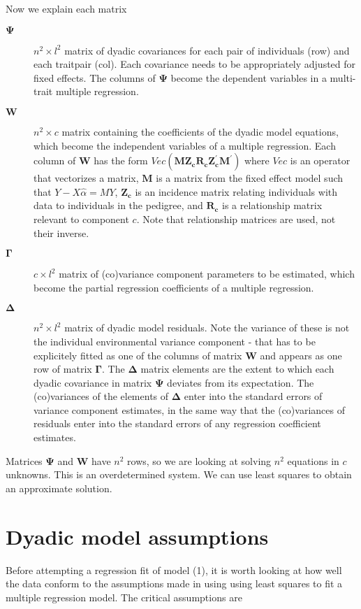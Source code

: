 \documentclass[titlepage,a4paper,12pt]{article}  %
\begin{document}
Now we explain each matrix 
\begin{description}
\item[$\bm{\Psi}$] $n^{2} \times l^{2}$ matrix of dyadic covariances for each pair of individuals (row) and each traitpair (col). Each covariance needs to be appropriately adjusted for fixed effects. The columns of $\bm{\Psi}$ become the dependent variables in a multi-trait multiple regression.
\item[$\bm{W}$] $n^{2} \times c$ matrix containing the coefficients of the dyadic model equations, which become the independent variables of a multiple regression. Each column of $\bm{W}$ has the form $Vec{\bm{(MZ_{c} R_{c} Z_{c}^{\prime}M^{\prime})}}$ where $Vec$ is an operator that vectorizes a matrix, $\bm{M}$ is a matrix from the fixed effect model such that \mbox{\boldmath $Y - X \hat{\alpha} = M Y$}, $\bm{Z_{c}}$ is an incidence matrix relating individuals with data to individuals in the pedigree, and $\bm{R_{c}}$ is a relationship matrix relevant to component $c$. Note that relationship matrices are used, not their inverse.
\item[$\bm{\Gamma}$] $c \times l^{2}$ matrix of (co)variance component parameters to be estimated, which become the partial regression coefficients of a multiple regression.
\item[$\bm{\Delta}$] $n^{2} \times l^{2}$ matrix of dyadic model residuals. Note the variance of these is not the individual environmental variance component - that has to be explicitely fitted as one of the columns of matrix $\bm{W}$ and appears as one row of matrix $\bm{\Gamma}$. The $\bm{\Delta}$ matrix elements are the extent to which each dyadic covariance in matrix $\bm{\Psi}$ deviates from its expectation. The (co)variances of the elements of $\bm{\Delta}$ enter into the standard errors of variance component estimates, in the same way that the (co)variances of residuals enter into the standard errors of any regression coefficient estimates. 
\end{description}

Matrices $\bm{\Psi}$ and $\bm{W}$ have $n^{2}$ rows, so we are looking at solving $n^{2}$ equations in $c$ unknowns. This is an overdetermined system. We can use least squares to obtain an approximate solution. 

\section{Dyadic model assumptions}
Before attempting a regression fit of model (1), it is worth looking at how well the data conform to the assumptions made in using using least squares to fit a multiple regression model. The critical assumptions are
\end{document}
